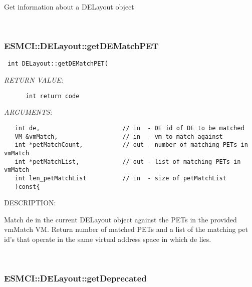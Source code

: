       Get information about a DELayout object
   
 
\mbox{}\hrulefill\
 
\subsubsection [ESMCI::DELayout::getDEMatchPET] {ESMCI::DELayout::getDEMatchPET}


  
\begin{verbatim} int DELayout::getDEMatchPET(\end{verbatim}{\em RETURN VALUE:}
\begin{verbatim}      int return code\end{verbatim}{\em ARGUMENTS:}
\begin{verbatim}   int de,                       // in  - DE id of DE to be matched
   VM &vmMatch,                  // in  - vm to match against
   int *petMatchCount,           // out - number of matching PETs in vmMatch
   int *petMatchList,            // out - list of matching PETs in vmMatch
   int len_petMatchList          // in  - size of petMatchList
   )const{\end{verbatim}
{\sf DESCRIPTION:\\ }


      Match de in the current DELayout object against the PETs in the
      provided vmMatch VM. Return number of matched PETs and a list of the
      matching pet id's that operate in the same virtual address space in which
      de lies.
   
 
\mbox{}\hrulefill\
 
\subsubsection [ESMCI::DELayout::getDeprecated] {ESMCI::DELayout::getDeprecated}


